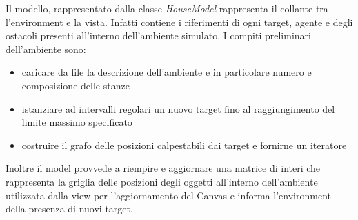 Il modello, rappresentato dalla classe \textit{HouseModel} rappresenta il collante tra l'environment e la vista. Infatti contiene i riferimenti di ogni target, agente e degli ostacoli presenti all'interno dell'ambiente simulato. 
I compiti preliminari dell'ambiente sono:
\begin{itemize}
	\item caricare da file la descrizione dell'ambiente e in particolare numero e composizione delle stanze
	\item istanziare ad intervalli regolari un nuovo target fino al raggiungimento del limite massimo specificato
	\item costruire il grafo delle posizioni calpestabili dai target e fornirne un iteratore
\end{itemize}
Inoltre il model provvede a riempire e aggiornare una matrice di interi che rappresenta la griglia delle posizioni degli oggetti all'interno dell'ambiente utilizzata dalla view per l'aggiornamento del Canvas e informa l'environment della presenza di nuovi target.